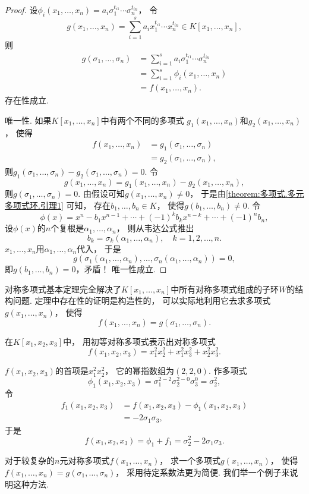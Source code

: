 \begin{theorem}[对称多项式基本定理]
\begin{proof}
设\(\phi_i(x_1,\dotsc,x_n)
=a_i \sigma_1^{t_{i1}} \dotsm \sigma_n^{t_{in}}\)，
令\[
	g(x_1,\dotsc,x_n)
	=\sum_{i=1}^s a_i x_1^{t_{i1}} \dotsm x_n^{t_{in}}
	\in K[x_1,\dotsc,x_n],
\]
则\begin{align*}
	g(\sigma_1,\dotsc,\sigma_n)
	&=\sum_{i=1}^s a_i \sigma_1^{t_{i1}} \dotsm \sigma_n^{t_{in}} \\
	&=\sum_{i=1}^s \phi_i(x_1,\dotsc,x_n) \\
	&=f(x_1,\dotsc,x_n).
\end{align*}
存在性成立.

唯一性.
如果\(K[x_1,\dotsc,x_n]\)中有两个不同的多项式
\(g_1(x_1,\dotsc,x_n)\)和\(g_2(x_1,\dotsc,x_n)\)，
使得\begin{align*}
	f(x_1,\dotsc,x_n)
	&=g_1(\sigma_1,\dotsc,\sigma_n) \\
	&=g_2(\sigma_1,\dotsc,\sigma_n),
\end{align*}
则\(g_1(\sigma_1,\dotsc,\sigma_n)-g_2(\sigma_1,\dotsc,\sigma_n)=0\).
令\[
	g(x_1,\dotsc,x_n)
	=g_1(x_1,\dotsc,x_n)-g_2(x_1,\dotsc,x_n),
\]
则\(g(\sigma_1,\dotsc,\sigma_n)=0\).
由假设可知\(g(x_1,\dotsc,x_n)\neq0\)，
于是由\cref{theorem:多项式.多元多项式环.引理1} 可知，
存在\(b_1,\dotsc,b_n \in K\)，
使得\(g(b_1,\dotsc,b_n)\neq0\).
令\[
	\phi(x)=x^n-b_1x^{n-1}+\dotsb+(-1)^kb_kx^{n-k}+\dotsb+(-1)^nb_n,
\]
设\(\phi(x)\)的\(n\)个复根是\(\alpha_1,\dotsc,\alpha_n\)，
则从韦达公式推出\[
	b_k=\sigma_k(\alpha_1,\dotsc,\alpha_n),
	\quad
	k=1,2,\dotsc,n.
\]
\(x_1,\dotsc,x_n\)用\(\alpha_1,\dotsc,\alpha_n\)代入，
于是\[
	g(\sigma_1(\alpha_1,\dotsc,\alpha_n),\dotsc,\sigma_n(\alpha_1,\dotsc,\alpha_n))=0,
\]
即\(g(b_1,\dotsc,b_n)=0\)，矛盾！
唯一性成立.
\end{proof}
\end{theorem}

对称多项式基本定理完全解决了\(K[x_1,\dotsc,x_n]\)中所有对称多项式组成的子环\(W\)的结构问题.
定理中存在性的证明是构造性的，
可以实际地利用它去求多项式\(g(x_1,\dotsc,x_n)\)，
使得\[
	f(x_1,\dotsc,x_n)
	=g(\sigma_1,\dotsc,\sigma_n).
\]

\begin{example}
在\(K[x_1,x_2,x_3]\)中，
用初等对称多项式表示出对称多项式\[
	f(x_1,x_2,x_3)
	=x_1^2 x_2^2
	+x_1^2 x_3^2
	+x_2^2 x_3^2.
\]
\begin{solution}
\(f(x_1,x_2,x_3)\)的首项是\(x_1^2 x_2^2\)，
它的幂指数组为\((2,2,0)\).
作多项式\[
	\phi_1(x_1,x_2,x_3)
	=\sigma_1^{2-2} \sigma_2^{2-0} \sigma_3^0
	=\sigma_2^2,
\]
令\begin{align*}
	f_1(x_1,x_2,x_3)
	&= f(x_1,x_2,x_3)
	- \phi_1(x_1,x_2,x_3) \\
	&= -2 \sigma_1 \sigma_3,
\end{align*}
于是\[
	f(x_1,x_2,x_3)
	=\phi_1+f_1
	=\sigma_2^2 - 2 \sigma_1 \sigma_3.
\]
\end{solution}
\end{example}

对于较复杂的\(n\)元对称多项式\(f(x_1,\dotsc,x_n)\)，
求一个多项式\(g(x_1,\dotsc,x_n)\)，
使得\(f(x_1,\dotsc,x_n)=g(\sigma_1,\dotsc,\sigma_n)\)，
采用待定系数法更为简便.
我们举一个例子来说明这种方法.

